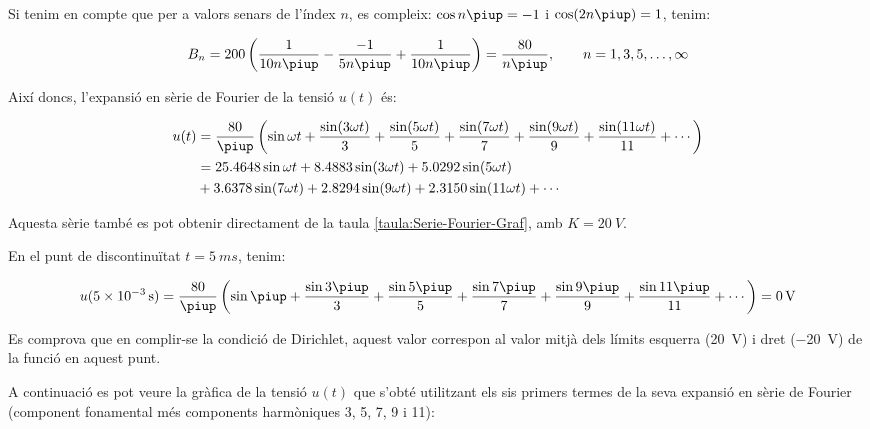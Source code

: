 \begin{exemple}
    Si tenim en compte que per a valors senars de l'índex $n$, es
    compleix: $\cos n \piup = -1$ i $\cos (2 n \piup) = 1$, tenim:

    \[
        B_n = 200 \left( \frac{1}{10 n \piup} - \frac{-1}{5 n \piup} +
        \frac{1}{10 n \piup} \right) = \frac{80}{n \piup},
        \qquad n=1,3,5,\ldots,\infty
    \]

    Així doncs, l'expansió en sèrie de Fourier de la tensió $u(t)$ és:

    \[\begin{split}
        u(t) &= \frac{80}{\piup} \left( \sin \omega t + \frac{\sin (3 \omega t)}{3} +
        \frac{\sin (5 \omega t)}{5} + \frac{\sin (7 \omega t)}{7} +
        \frac{\sin (9 \omega t)}{9} + \frac{\sin (11 \omega t)}{11} +\cdots\right) \\
        &= \num{25,4648} \sin \omega t + \num{8,4883} \sin (3 \omega t) + \num{5,0292} \sin (5 \omega t) \\
        &+ \num{3,6378} \sin (7 \omega t) + \num{2,8294} \sin (9 \omega t) + \num{2,3150} \sin (11 \omega t) +\cdots
    \end{split}\]

  
    Aquesta sèrie també es pot obtenir directament de la taula \vref{taula:Serie-Fourier-Graf}, amb $K=\qty{20}{V}$.

    En el punt de discontinuïtat $t=\qty{5}{ms}$, tenim:

    \[
        u(\qty{5e-3}{s}) =\frac{80}{\piup} \left( \sin \piup + \frac{\sin 3 \piup}{3} +
        \frac{\sin 5 \piup}{5} + \frac{\sin 7 \piup}{7} +
        \frac{\sin 9 \piup}{9} +\frac{\sin 11 \piup}{11}+\cdots\right) = \qty{0}{V}
    \]

    Es comprova que en complir-se la condició de Dirichlet, aquest valor
    correspon al valor mitjà dels límits esquerra (\qty{20}{V}) i dret (\qty{-20}{V})  de
    la funció en aquest punt.

    A continuació es pot veure la gràfica de la tensió $u(t)$ que
    s'obté utilitzant els sis primers termes de la seva expansió en sèrie de Fourier (component fonamental més components harmòniques 3, 5, 7, 9 i 11):

    \begin{center}
        
    \end{center}


\end{exemple}
